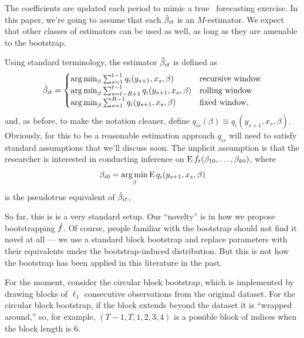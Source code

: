 \documentclass[12pt,fleqn]{article}
\begin{document}
The coefficients are updated each period to mimic a true \oos\
forecasting exercise. In this paper, we're going to assume that each
$\hat \beta_{it}$ is an $M$-estimator. We expect that other classes of
estimators can be used as well, as long as they are amenable to the
bootstrap.

Using standard terminology, the estimator $\hat \beta_{it}$ is defined as
\begin{equation}\label{eq:9}
  \hat\beta_{it} = \begin{cases}
    \operatorname*{arg\,min}_\beta \sum_{s=1}^{t-1} q_i(y_{s+1}, x_s, \beta) & \text{recursive window} \\
    \operatorname*{arg\,min}_\beta \sum_{s=t-R+1}^{t-1} q_i(y_{s+1}, x_s, \beta) & \text{rolling window} \\
    \operatorname*{arg\,min}_\beta \sum_{s=1}^{R-1} q_i(y_{s+1}, x_s, \beta) & \text{fixed window},
  \end{cases}
\end{equation}
and, as before, to make the notation cleaner, define $q_{is}(\beta)
\equiv q_i(y_{s+1},x_s,\beta)$. Obviously, for this to be a reasonable
estimation approach $q_{is}$ will need to satisfy standard assumptions
that we'll discuss soon. The implicit assumption is that the
researcher is interested in conducting inference on $\operatorname{E}
f_t(\beta_{10},\dots,\beta_{k0})$, where
\begin{equation*}
  \beta_{i0} = \operatorname*{arg\,min}_\beta \operatorname{E} q_i(y_{s+1}, x_s, \beta)
\end{equation*}
is the pseudotrue equivalent of $\hat \beta_{it}$,

So far, this is is a very standard setup. Our ``novelty'' is in how we
propose bootstrapping $\bar f$. Of course, people familiar with the
bootstrap should not find it novel at all --- we use a standard block
bootstrap and replace parameters with their equivalents under the
bootstrap-induced distribution. But this is not how the bootstrap has
been applied in this literature in the past.

For the moment, consider the circular block bootstrap, which is
implemented by drawing blocks of $\ell_1$ consecutive observations
from the original dataset. For the circular block bootstrap, if the
block extends beyond the dataset it is ``wrapped around,'' so, for
example, $(T-1, T, 1, 2, 3, 4)$ is a possible block of indices when
the block length is 6.
\end{document}
